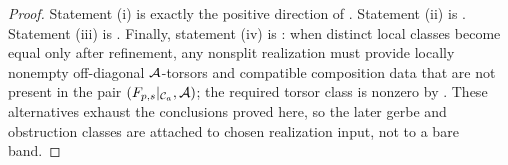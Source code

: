 \begin{proof}
Statement \textup{(i)} is exactly the positive direction of
. Statement \textup{(ii)} is
. Statement \textup{(iii)} is
. Finally, statement \textup{(iv)}
is : when distinct local classes become
equal only after refinement, any nonsplit realization must provide locally
nonempty off-diagonal $\mathcal{A}$-torsors and compatible composition data that are
not present in the pair $(F_{p,s}|_{\mathcal C_a},\mathcal{A})$; the required torsor
class is nonzero by . These alternatives
exhaust the conclusions proved here, so the later gerbe and obstruction
classes are attached to chosen realization input, not to a bare band.
\end{proof}


